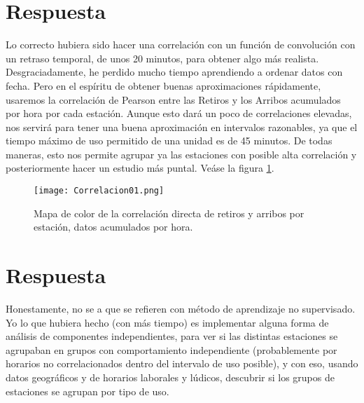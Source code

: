 \documentclass{article}
\begin{document}
\section{Respuesta}

Lo correcto hubiera sido hacer una correlación con un función de convolución con un retraso temporal, de unos 20 minutos, para obtener algo más realista. Desgraciadamente, he perdido mucho tiempo aprendiendo a ordenar datos con fecha. Pero en el espíritu de obtener buenas aproximaciones rápidamente, usaremos la correlación de Pearson entre las Retiros y los Arribos acumulados por hora por cada estación. Aunque esto dará un poco de correlaciones elevadas, nos servirá para tener una buena aproximación en intervalos razonables, ya que el tiempo máximo de uso permitido de una unidad es de 45 minutos. De todas maneras, esto nos permite agrupar ya las estaciones con posible alta correlación y posteriormente hacer un estudio más puntal. Veáse la figura \ref{corr}.

\begin{figure}[h]
  \texttt{[image: Correlacion01.png]}
  \caption{Mapa de color de la correlación directa de retiros y arribos por estación, datos acumulados por hora.}\label{corr}
\end{figure}

\section{Respuesta}

Honestamente, no se a que se refieren con método de aprendizaje no supervisado. Yo lo que hubiera hecho (con más tiempo) es implementar alguna forma de análisis de componentes independientes, para ver si las distintas estaciones se agrupaban en grupos con comportamiento independiente (probablemente por horarios no correlacionados dentro del intervalo de uso posible), y con eso, usando datos geográficos y de horarios laborales y lúdicos, descubrir si los grupos de estaciones se agrupan por tipo de uso.
\end{document}
